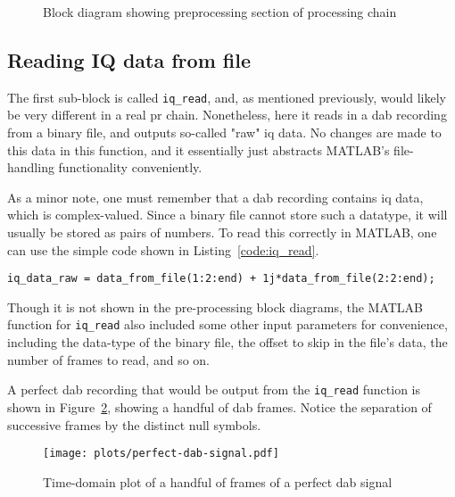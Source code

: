 \documentclass[class=report,11pt,crop=false]{standalone}
\begin{document}
\begin{figure}[htbp]
    \centering
    \captionsetup{type=figure}
    \def\svgwidth{\linewidth}
    { %
        }
    \caption{Block diagram showing preprocessing section of processing chain}
    \label{fig:BD_Preprocess_All}
\end{figure}

\subsection{Reading IQ data from file \label{subsect:dab-proc_iq-read}}
The first sub-block is called \texttt{iq\_read}, and, as mentioned previously, would likely be very different in a real \gls{pr} chain. Nonetheless, here it reads in a \gls{dab} recording from a binary file, and outputs so-called "raw" \gls{iq} data. No changes are made to this data in this function, and it essentially just abstracts MATLAB's file-handling functionality conveniently.

As a minor note, one must remember that a \gls{dab} recording contains \gls{iq} data, which is complex-valued. Since a binary file cannot store such a datatype, it will usually be stored as pairs of numbers. To read this correctly in MATLAB, one can use the simple code shown in Listing~\ref{code:iq_read}.

\begin{lstlisting}[caption={Creating a complex data array with the values read from a binary file},label={code:iq_read}]
iq_data_raw = data_from_file(1:2:end) + 1j*data_from_file(2:2:end);
\end{lstlisting}

Though it is not shown in the pre-processing block diagrams, the MATLAB function for \texttt{iq\_read} also included some other input parameters for convenience, including the data-type of the binary file, the offset to skip in the file's data, the number of frames to read, and so on.

A perfect \gls{dab} recording that would be output from the \texttt{iq\_read} function is shown in Figure~\ref{fig:plots/perfect-dab-signal}, showing a handful of \gls{dab} frames. Notice the separation of successive frames by the distinct null symbols.

\begin{figure}[htbp]
  \centering
  \captionsetup{type=figure}
  \texttt{[image: plots/perfect-dab-signal.pdf]}
  \caption{Time-domain plot of a handful of frames of a perfect \gls{dab} signal}
  \label{fig:plots/perfect-dab-signal}
\end{figure}
\end{document}
